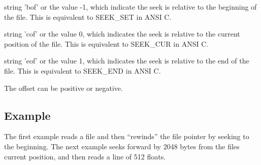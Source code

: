 \begin{DoxyItemize}
\item string {\ttfamily 'bof'} or the value -\/1, which indicate the seek is relative to the beginning of the file. This is equivalent to {\ttfamily S\-E\-E\-K\-\_\-\-S\-E\-T} in A\-N\-S\-I C.  
\item string {\ttfamily 'cof'} or the value 0, which indicates the seek is relative to the current position of the file. This is equivalent to {\ttfamily S\-E\-E\-K\-\_\-\-C\-U\-R} in A\-N\-S\-I C.  
\item string {\ttfamily 'eof'} or the value 1, which indicates the seek is relative to the end of the file. This is equivalent to {\ttfamily S\-E\-E\-K\-\_\-\-E\-N\-D} in A\-N\-S\-I C.  
\end{DoxyItemize}The offset can be positive or negative. \hypertarget{variables_struct_Example}{}\subsection{Example}\label{variables_struct_Example}
The first example reads a file and then ``rewinds'' the file pointer by seeking to the beginning. The next example seeks forward by 2048 bytes from the files current position, and then reads a line of 512 floats.


